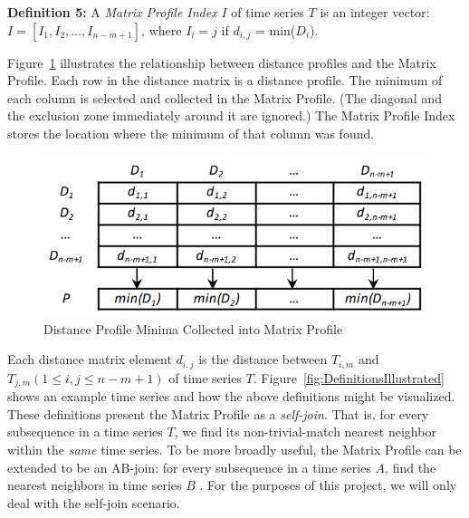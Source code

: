 \documentclass[conference]{IEEEtran}
\begin{document}
\textbf{Definition 5:} A \emph{Matrix Profile Index} $I$ of time series $T$ is an integer vector: $I = [I_1, I_2, \ldots{}, I_{n-m+1}]$, where $I_i = j$ if $d_{i,j}$ = min($D_i$).

Figure~\ref{fig:DistanceProfilesIntoMatrixProfile} illustrates the relationship between distance profiles and the Matrix Profile.  Each row in the distance matrix is a distance profile.  The minimum of each column is selected and collected in the Matrix Profile.  (The diagonal and the exclusion zone immediately around it are ignored.)  The Matrix Profile Index stores the location where the minimum of that column was found\cite{MatrixProfile14}.

\begin{figure}
\begin{center}
\includegraphics[scale=0.40]{distance_profiles_into_matrix_profile.png}
\caption{Distance Profile Minima Collected into Matrix Profile}
\label{fig:DistanceProfilesIntoMatrixProfile}
\end{center}
\end{figure}

Each distance matrix element $d_{i,j}$ is the distance between $T_{i,m}$ and $T_{j,m} (1 \leq i, j \leq n-m+1)$ of time series $T$.  Figure~\ref{fig:DefinitionsIllustrated} shows an example time series and how the above definitions might be visualized\cite{MatrixProfile11}.  These definitions present the Matrix Profile as a \emph{self-join}.  That is, for every subsequence in a time series $T$, we find its non-trivial-match nearest neighbor within the \emph{same} time series.  To be more broadly useful, the Matrix Profile can be extended to be an AB-join: for every subsequence in a time series $A$, find the nearest neighbors in time series $B$ \cite{MatrixProfile2}\cite{MatrixProfile14}.  For the purposes of this project, we will only deal with the self-join scenario.
\end{document}
